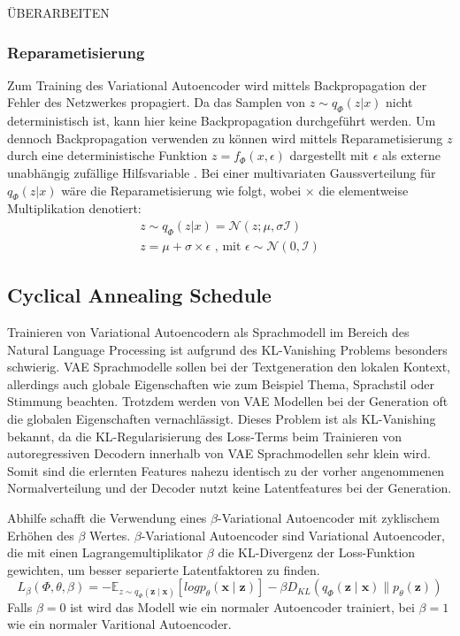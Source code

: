 ÜBERARBEITEN
\subsubsection{Reparametisierung} %
Zum Training des Variational Autoencoder wird mittels Backpropagation der Fehler des Netzwerkes propagiert. Da das Samplen von $z \sim q_\Phi(z|x)$ nicht deterministisch ist, kann hier keine Backpropagation durchgeführt werden.
Um dennoch Backpropagation verwenden zu können wird mittels Reparametisierung $z$ durch eine deterministische Funktion $z=f_\Phi(x,\epsilon)$ dargestellt mit $\epsilon$ als externe unabhängig zufällige Hilfsvariable \citep{kingma2014autoencoding,jordan_2018}. 
Bei einer multivariaten Gaussverteilung für $q_\Phi (z|x)$ wäre die Reparametisierung wie folgt, wobei $\times$ die elementweise Multiplikation denotiert:
\begin{align}
    z \sim q_\Phi(z|x) = \mathcal{N}(z;\mu,\sigma \mathcal{I}) \\
    z = \mu + \sigma \times \epsilon \text{ , mit } \epsilon \sim \mathcal{N}(0,\mathcal{I}) 
\end{align}

\subsection{Cyclical Annealing Schedule}
\label{cyc_anneal}
Trainieren von Variational Autoencodern als Sprachmodell im Bereich des Natural Language Processing ist aufgrund des KL-Vanishing Problems besonders schwierig.
VAE Sprachmodelle sollen bei der Textgeneration den lokalen Kontext, allerdings auch globale Eigenschaften wie zum Beispiel Thema, Sprachstil oder Stimmung beachten. 
Trotzdem werden von VAE Modellen bei der Generation oft die globalen Eigenschaften vernachlässigt. 
Dieses Problem ist als KL-Vanishing bekannt, da die KL-Regularisierung des Loss-Terms beim Trainieren von autoregressiven Decodern innerhalb von VAE Sprachmodellen sehr klein wird.
Somit sind die erlernten Features nahezu identisch zu der vorher angenommenen Normalverteilung und der Decoder nutzt keine Latentfeatures bei der Generation. %

Abhilfe schafft die Verwendung eines $\beta$-Variational Autoencoder \citep{cyc_anneal} mit zyklischem Erhöhen des $\beta$ Wertes.
$\beta$-Variational Autoencoder sind Variational Autoencoder, die mit einen Lagrangemultiplikator $\beta$ die KL-Divergenz der Loss-Funktion gewichten, um besser separierte Latentfaktoren zu finden.
\begin{equation}
    L_{\beta}(\Phi,\theta,\beta) = -\mathbb{E}_{z\sim q_\Phi(\mathbf{z\mid x})}[log p_\theta (\mathbf{x\mid z})]- \beta D_{KL}(q_\Phi(\mathbf{z\mid x}) \parallel p_\theta(\mathbf{z})) 
\end{equation}
Falls $\beta = 0$ ist wird das Modell wie ein normaler Autoencoder trainiert, bei $\beta = 1$ wie ein normaler Varitional Autoencoder.

